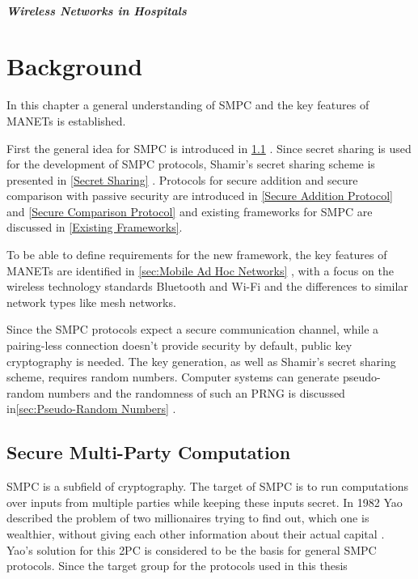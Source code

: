 		\paragraph{Wireless Networks in Hospitals}

\chapter{Background }
\label{Background}
	
	In this chapter a general understanding of \gls{SMPC} and the key features of \gls{MANET}s is established.  
	
	First the general idea for \gls{SMPC} is introduced in \ref{Secure Multi-Party Computation} . Since secret sharing is used for the development of \gls{SMPC} protocols, Shamir's secret sharing scheme is presented in \ref{Secret Sharing} .
	Protocols for secure addition and secure comparison with passive security are introduced in \ref{Secure Addition Protocol} and \ref{Secure Comparison Protocol} and existing frameworks for \gls{SMPC} are discussed in \ref{Existing Frameworks}.
	
	To be able to define requirements for the new framework, the key features of \gls{MANET}s are identified in \ref{sec:Mobile Ad Hoc Networks} , with a focus on the wireless technology standards Bluetooth and Wi-Fi and the differences to similar network types like mesh networks.
	
	Since the \gls{SMPC} protocols expect a secure communication channel, while a pairing-less connection doesn't provide security by default, public key cryptography is needed. The key generation, as well as Shamir's secret sharing scheme, requires random numbers. Computer systems can generate pseudo-random numbers and the randomness of such an \gls{PRNG} is discussed in\ref{sec:Pseudo-Random Numbers} .
		
	\section{Secure Multi-Party Computation}
	\label{Secure Multi-Party Computation}
	
		\gls{SMPC} is a subfield of cryptography. The target of \gls{SMPC} is to run computations over inputs from multiple parties while keeping these inputs secret. In 1982 Yao described the problem of two millionaires trying to find out, which one is wealthier, without giving each other information about their actual capital \autocite{Yao1982}. Yao's solution for this \gls{2PC} is considered to be the basis for general \gls{SMPC} protocols. Since the target group for the protocols used in this thesis 
		
